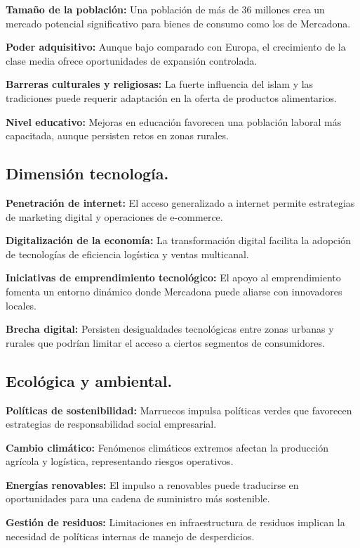 \documentclass{article}  %
\begin{document}
\textbf{Tamaño de la población:} Una población de más de 36 millones
crea un mercado potencial significativo para bienes de consumo como los
de Mercadona.

\textbf{Poder adquisitivo:} Aunque bajo comparado con Europa, el
crecimiento de la clase media ofrece oportunidades de expansión
controlada.

\textbf{Barreras culturales y religiosas:} La fuerte influencia del
islam y las tradiciones puede requerir adaptación en la oferta de
productos alimentarios.

\textbf{Nivel educativo:} Mejoras en educación favorecen una población
laboral más capacitada, aunque persisten retos en zonas rurales.

\subsection{Dimensión tecnología.}\label{dimensiuxf3n-tecnologuxeda.}

\textbf{Penetración de internet:} El acceso generalizado a internet
permite estrategias de marketing digital y operaciones de e-commerce.

\textbf{Digitalización de la economía:} La transformación digital
facilita la adopción de tecnologías de eficiencia logística y ventas
multicanal.

\textbf{Iniciativas de emprendimiento tecnológico:} El apoyo al
emprendimiento fomenta un entorno dinámico donde Mercadona puede aliarse
con innovadores locales.

\textbf{Brecha digital:} Persisten desigualdades tecnológicas entre
zonas urbanas y rurales que podrían limitar el acceso a ciertos
segmentos de consumidores.

\subsection{Ecológica y ambiental.}\label{ecoluxf3gica-y-ambiental.}

\textbf{Políticas de sostenibilidad:} Marruecos impulsa políticas verdes
que favorecen estrategias de responsabilidad social empresarial.

\textbf{Cambio climático:} Fenómenos climáticos extremos afectan la
producción agrícola y logística, representando riesgos operativos.

\textbf{Energías renovables:} El impulso a renovables puede traducirse
en oportunidades para una cadena de suministro más sostenible.

\textbf{Gestión de residuos:} Limitaciones en infraestructura de
residuos implican la necesidad de políticas internas de manejo de
desperdicios.
\end{document}
